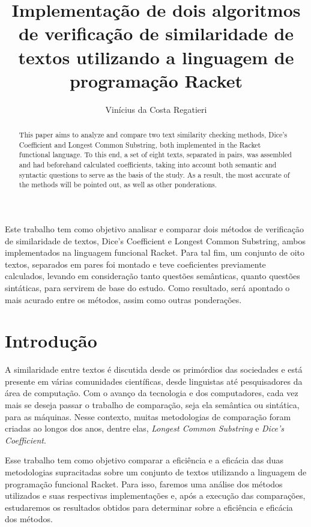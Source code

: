\documentclass[12pt]{article}
\title{Implementação de dois algoritmos de verificação de similaridade de textos utilizando a linguagem de programação Racket}
\author{Vinícius da Costa Regatieri\inst{1}}
\begin{document}
 

\maketitle

\begin{abstract}
This paper aims to analyze and compare two text similarity checking methods, Dice's Coefficient and Longest Common Substring, both implemented in the Racket functional language. To this end, a set of eight texts, separated in pairs, was assembled and had beforehand calculated coefficients, taking into account both semantic and syntactic questions to serve as the basis of the study. As a result, the most accurate of the methods will be pointed out, as well as other ponderations.
\end{abstract}
     
\begin{resumo} 
Este trabalho tem como objetivo analisar e comparar dois métodos de verificação de similaridade de textos, Dice's Coefficient e Longest Common Substring, ambos implementados na linguagem funcional Racket. Para tal fim, um conjunto de oito textos, separados em pares foi montado e teve coeficientes previamente calculados, levando em consideração tanto questões semânticas, quanto questões sintáticas, para servirem de base do estudo. Como resultado, será apontado o mais acurado entre os métodos, assim como outras ponderações.
\end{resumo}

\section{Introdução}
A similaridade entre textos é discutida desde os primórdios das sociedades e está presente em várias comunidades científicas, desde linguistas até pesquisadores da área de computação. Com o avanço da tecnologia e dos computadores, cada vez mais se deseja passar o trabalho de comparação, seja ela semântica ou sintática, para as máquinas. Nesse contexto, muitas metodologias de comparação foram criadas ao longos dos anos, dentre elas, \textit{Longest Common Substring} e \textit{Dice's Coefficient}.

Esse trabalho tem como objetivo comparar a eficiência e a eficácia das duas metodologias supracitadas sobre um conjunto de textos utilizando a linguagem de programação funcional Racket. Para isso, faremos uma análise dos métodos utilizados e suas respectivas implementações e, após a execução das comparações, estudaremos os resultados obtidos para determinar sobre a eficiência e eficácia dos métodos.
\end{document}
